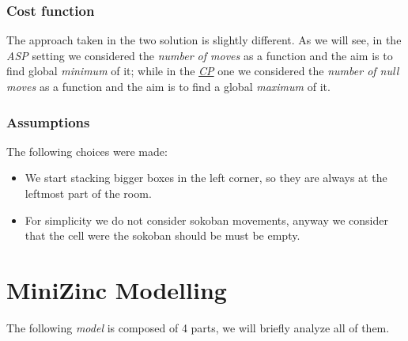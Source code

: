 \documentclass[headinclude, footinclude, abstract=on]{scrarticle}
\begin{document}
\subsubsection{Cost function}The approach taken in the two solution is slightly different. As we will see, in the \textit{ASP} setting we considered the \textit{number of moves} as a function and the aim is to find global \textit{minimum} of it; while in the \hyperref[sec:mzn]{\textit{CP}} one we considered the \textit{number of null moves} as a function and the aim is to find a global \textit{maximum} of it.

\subsubsection{Assumptions} The following choices were made:
\begin{itemize}
    \item We start stacking bigger boxes in the left corner, so they are always at the leftmost part of the room.  
    \item For simplicity we do not consider sokoban movements, anyway we consider that the cell were the sokoban should be must be empty.  
\end{itemize}
\section{MiniZinc Modelling}\label{sec:mzn}
The following \textit{model} is composed of 4 parts, we will briefly analyze all of them.
\end{document}
